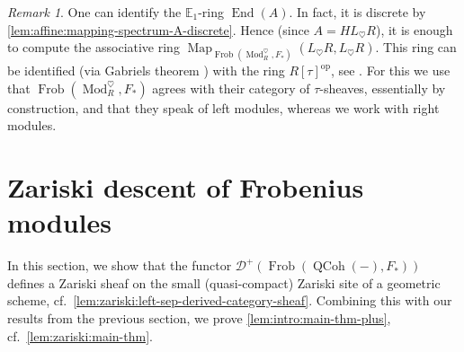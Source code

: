 \documentclass{article}
\theoremstyle{definition}
\theoremstyle{definition}
\theoremstyle{definition}
\theoremstyle{plain}
\theoremstyle{plain}
\theoremstyle{plain}
\theoremstyle{plain}
\theoremstyle{plain}
\theoremstyle{plain}
\theoremstyle{plain}
\theoremstyle{plain}
\theoremstyle{remark}
\newtheorem{rmk}[defn]{Remark}
\theoremstyle{remark}
\theoremstyle{plain}
\theoremstyle{plain}
\theoremstyle{plain}
\theoremstyle{plain}
\theoremstyle{plain}
\newcommand{\ModDisc}[1]{\operatorname{Mod}_{#1}^{\heartsuit}}
\newcommand{\QCoh}[1]{\operatorname{QCoh}(#1)}
\newcommand{\Frob}[2]{\operatorname{Frob}(#1, #2)}
\newcommand{\End}[1]{\operatorname{End}(#1)}
\newcommand{\Cat}[1]{\mathcal{#1}}
\newcommand{\Map}[3]{\operatorname{Map}_{#1}({#2}, {#3})} %
\begin{document}
\begin{rmk}
    One can identify the $\mathbb{E}_1$-ring $\End{A}$.
    In fact, it is discrete by \cref{lem:affine:mapping-spectrum-A-discrete}.
    Hence (since $A = HL_{\heartsuit} R$), it is enough to compute the associative ring $\Map{\Frob{\ModDisc{R}}{F_*}}{L_\heartsuit R}{L_\heartsuit R}$.
    This ring can be identified (via Gabriels theorem \cite[Corollaire V.1.1]{gabriel}) with the ring $R[\tau]^{\mathrm{op}}$, see \cite[Definition 3.2.1]{bockle2014cohomological}.
    For this we use that $\Frob{\ModDisc{R}}{F_*}$ agrees with their category of $\tau$-sheaves, essentially by construction,
    and that they speak of left modules, whereas we work with right modules.
\end{rmk}

\section{Zariski descent of Frobenius modules}

In this section, we show that the functor $\Cat D^+(\Frob{\QCoh{-}}{F_*})$
defines a Zariski sheaf on the small (quasi-compact) Zariski site of a geometric scheme, cf.\ \cref{lem:zariski:left-sep-derived-category-sheaf}.
Combining this with our results from the previous section, we prove \cref{lem:intro:main-thm-plus}, cf.\ \cref{lem:zariski:main-thm}.
\end{document}
